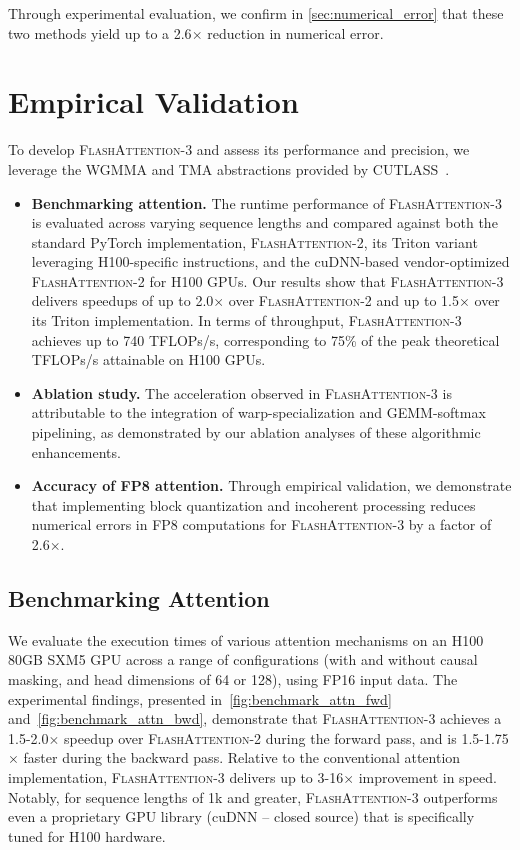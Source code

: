 \begin{enumerate}
Through experimental evaluation, we confirm in \cref{sec:numerical_error} that these two methods yield up to a 2.6$\times$ reduction in numerical error.

\section{Empirical Validation}
\label{sec:exp}

To develop \textsc{FlashAttention-3} and assess its performance and precision, we leverage the WGMMA and TMA abstractions provided by CUTLASS~\citep{Thakkar_CUTLASS_2023}.

\begin{itemize}

\item \textbf{Benchmarking attention.} The runtime performance of \textsc{FlashAttention-3} is evaluated across varying sequence lengths and compared against both the standard PyTorch implementation, \textsc{FlashAttention-2}, its Triton variant leveraging H100-specific instructions, and the cuDNN-based vendor-optimized \textsc{FlashAttention-2} for H100 GPUs. Our results show that \textsc{FlashAttention-3} delivers speedups of up to 2.0$\times$ over \textsc{FlashAttention-2} and up to 1.5$\times$ over its Triton implementation. In terms of throughput, \textsc{FlashAttention-3} achieves up to 740 TFLOPs/s, corresponding to 75\% of the peak theoretical TFLOPs/s attainable on H100 GPUs.
\item \textbf{Ablation study.} The acceleration observed in \textsc{FlashAttention-3} is attributable to the integration of warp-specialization and GEMM-softmax pipelining, as demonstrated by our ablation analyses of these algorithmic enhancements.
\item \textbf{Accuracy of FP8 attention.} Through empirical validation, we demonstrate that implementing block quantization and incoherent processing reduces numerical errors in FP8 computations for \textsc{FlashAttention-3} by a factor of 2.6$\times$.
\end{itemize}

\subsection{Benchmarking Attention}
\label{subsec:benchmark_attn}

We evaluate the execution times of various attention mechanisms on an H100 80GB SXM5 GPU across a range of configurations (with and without causal masking, and head dimensions of 64 or 128), using FP16 input data. The experimental findings, presented in~\cref{fig:benchmark_attn_fwd} and~\cref{fig:benchmark_attn_bwd}, demonstrate that \textsc{FlashAttention-3} achieves a 1.5-2.0$\times$ speedup over \textsc{FlashAttention-2} during the forward pass, and is 1.5-1.75$\times$ faster during the backward pass. Relative to the conventional attention implementation, \textsc{FlashAttention-3} delivers up to 3-16$\times$ improvement in speed. Notably, for sequence lengths of 1k and greater, \textsc{FlashAttention-3} outperforms even a proprietary GPU library (cuDNN -- closed source) that is specifically tuned for H100 hardware.


\end{enumerate}
